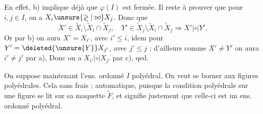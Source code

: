 En effet, b) implique déjà que $\varphi(I)$ est fermée. Il reste à prouver que  pour $i,j\in I$, on a $X_i\unsure{\gtrless|\bowtie}X_j$. Donc que
\[
X'\in\widetilde X_i\setminus\widetilde X_i\cap\widetilde X_j,\quad Y'\in\widetilde X_j\setminus\widetilde X_i\cap\widetilde X_j\Longrightarrow X'\mathrel{|\circ|}Y'.
\]
Or par  b) on aura $X'=X_{i'}$, avec $i'\leq i$, idem pour $Y'=\deleted{\unsure{Y}}X_{j'}$, avec $j'\leq j$ ; d'ailleurs comme $X'\ne Y'$ on aura $i'\ne j'$ par a), Donc on a $X_{i'}\mathrel{|\circ|}X_{j'}$ par c), qed.

  On suppose maintenant l'ens. ordonné $I$ polyédral. On veut se borner aux figures polyédrales. Cela   sans frais ;   automatique, puisque la condition polyédrale sur une figure se lit sur sa maquette  $\widetilde F$, et signifie justement que celle-ci est un ens. ordonné polyédral.

